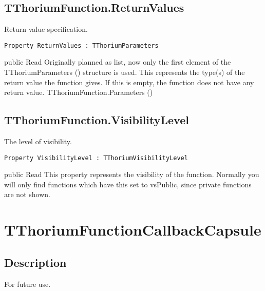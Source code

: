 \subsection{TThoriumFunction.ReturnValues}
\label{thoriumcorepkg:thorium:tthoriumfunction:returnvalues}
\begin{FPCList}
\Synopsis
Return value specification.\Declaration 

\begin{verbatim}
Property ReturnValues : TThoriumParameters
\end{verbatim}
\Visibility
public
\Access
Read
\Description
Originally planned as list, now only the first element of the TThoriumParameters (\pageref{thoriumcorepkg:thorium:tthoriumparameters}) structure is used. This represents the type(s) of the return value the function gives. If this is empty, the function does not have any return value.\SeeAlso
TThoriumFunction.Parameters (\pageref{thoriumcorepkg:thorium:tthoriumfunction:parameters})\end{FPCList}
\subsection{TThoriumFunction.VisibilityLevel}
\label{thoriumcorepkg:thorium:tthoriumfunction:visibilitylevel}
\begin{FPCList}
\Synopsis
The level of visibility.\Declaration 

\begin{verbatim}
Property VisibilityLevel : TThoriumVisibilityLevel
\end{verbatim}
\Visibility
public
\Access
Read
\Description
This property represents the visibility of the function. Normally you will only find functions which have this set to vsPublic, since private functions are not shown.\end{FPCList}
\section{TThoriumFunctionCallbackCapsule}
\label{thoriumcorepkg:thorium:tthoriumfunctioncallbackcapsule}
\subsection{Description}
For future use.%
